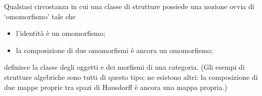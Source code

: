 \begin{example}
\end{example}
\begin{example}
\end{example}
\begin{example}
\end{example}
\begin{example}
\end{example}
\begin{example}
\end{example}
\begin{example}
\end{example}
\begin{example}
\end{example}
\begin{example}
\end{example}
\begin{example}
\end{example}

Qualsiasi circostanza in cui una classe di strutture possiede una nozione ovvia di `omomorfismo' tale che
\begin{itemize}
    \item l'identità è un omomorfismo;
    \item la composizione di due omomorfismi è ancora un omomorfismo;
\end{itemize}
definisce la classe degli oggetti e dei morfismi di una categoria. (Gli esempi di strutture algebriche sono tutti di questo tipo; ne esistono altri: la composizione di due mappe proprie tra spazi di Hausdorff è ancora una mappa propria.)

